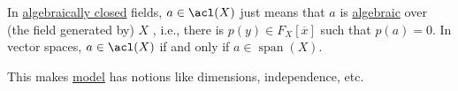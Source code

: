 In \hyperref[def:algebraically-closed]{algebraically closed} fields, \(a\in \acl(X) \) just means that \(a\) is \hyperref[def:algebraic]{algebraic} over (the field generated by) \(X\) , i.e., there is \(p(y) \in F_X[\overline{x} ]\) such that \(p(a) = 0\). In vector spaces, \(a\in \acl(X) \) if and only if \(a\in \mathop{\mathrm{span}}(X) \).

\begin{intuition}
	This makes \hyperref[def:model]{model} has notions like dimensions, independence, etc.
\end{intuition}
